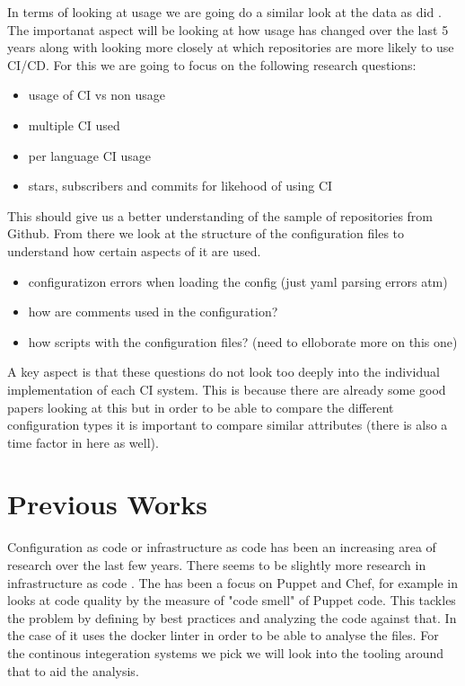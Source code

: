 \documentclass[twoside,12pt,titlepage,a4paper]{article}
\begin{document}
In terms of looking at usage we are going do a similar look at the data as did \cite{Hilton2016}. The importanat aspect will be looking at how usage has changed over the last 5 years along with looking more closely at which repositories are more likely to use CI/CD. For this we are going to focus on the following research questions:
\begin{itemize}
  \item usage of CI vs non usage
  \item multiple CI used
  \item per language CI usage
  \item stars, subscribers and commits for likehood of using CI
\end{itemize}

This should give us a better understanding of the sample of repositories from Github. From there we look at the structure of the configuration files to understand how certain aspects of it are used.
\begin{itemize}
  \item configuratizon errors when loading the config (just yaml parsing errors atm)
  \item how are comments used in the configuration?
  \item  how scripts with the configuration files? (need to elloborate more on this one)
\end{itemize}

A key aspect is that these questions do not look too deeply into the individual implementation of each CI system. This is because there are already some good papers looking \cite{Gallaba2018} at this but in order to be able to compare the different configuration types it is important to compare similar attributes (there is also a time factor in here as well). 

\section{Previous Works}
\label{config as code}

Configuration as code or infrastructure as code has been an increasing area of research over the last few years. There seems to be slightly more research in infrastructure as code \cite{Rahman2019}. The has been a focus on Puppet and Chef, for example in \cite{Sharma2016} looks at code quality by the measure of "code smell" of Puppet code. This tackles the problem by defining by best practices and analyzing the code against that. In the case of \cite{Cito2017} it uses the docker linter in order to be able to analyse the files. 
For the continous integeration systems we pick we will look into the tooling around that to aid the analysis.
\end{document}
